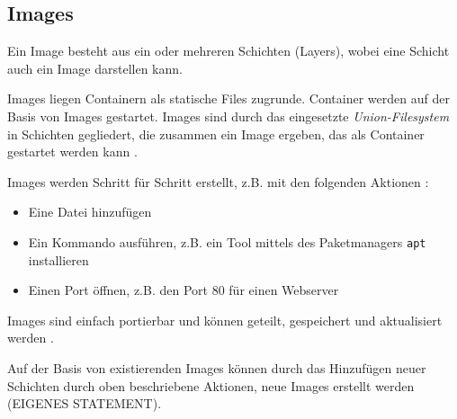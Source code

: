 \documentclass[11pt,a4paper,oneside]{report}
\begin{document}



    \subsection{Images}
    \label{dockerImages}
      Ein Image besteht aus ein oder mehreren Schichten (Layers), wobei eine Schicht auch ein Image darstellen kann.

      Images liegen Containern als statische Files zugrunde. Container werden auf der Basis von Images gestartet. Images sind durch das eingesetzte \emph{Union-Filesystem} in Schichten gegliedert, die zusammen ein Image ergeben, das als Container gestartet werden kann \cite[S.11]{dockerBook}.





      Images werden Schritt für Schritt erstellt, z.B. mit den folgenden Aktionen \cite[S.11]{dockerBook}:

      \begin{itemize}
        \item Eine Datei hinzufügen
        \item Ein Kommando ausführen, z.B. ein Tool mittels des Paketmanagers \texttt{apt} installieren
        \item Einen Port öffnen, z.B. den Port 80 für einen Webserver
      \end{itemize}

      Images sind einfach portierbar und können geteilt, gespeichert und aktualisiert werden \cite[S.11]{dockerBook}.

      Auf der Basis von existierenden Images können durch das Hinzufügen neuer Schichten durch oben beschriebene Aktionen, neue Images erstellt werden (EIGENES STATEMENT).
\end{document}
